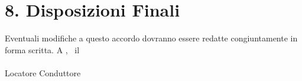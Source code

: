 \section*{8. Disposizioni Finali}
Eventuali modifiche a questo accordo dovranno essere redatte congiuntamente in forma scritta. 
\vspace{2cm}
A \ContractPlace, \ il \ContractDate \hfill \underline{\hspace{5cm}} \\ \vspace{1.5cm}
\underline{\hspace{5cm}} \hfill \underline{\hspace{5cm}} \\ \vspace{0.2cm} Locatore \hfill Conduttore \\
